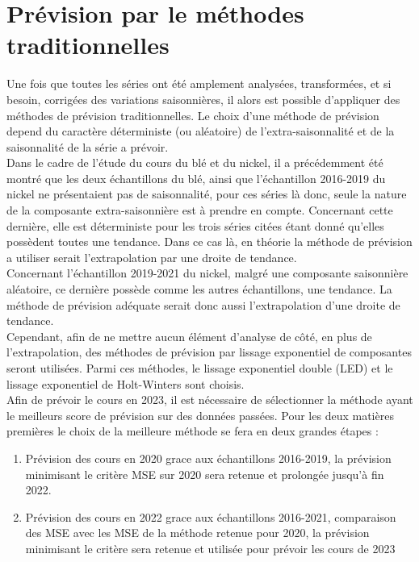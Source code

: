 \section{Prévision par le méthodes traditionnelles}
Une fois que toutes les séries ont été amplement analysées, transformées, et si besoin, corrigées des variations saisonnières, il alors est possible d'appliquer des 
méthodes de prévision traditionnelles. Le choix d'une méthode de prévision depend du caractère déterministe (ou aléatoire) de l'extra-saisonnalité et de la saisonnalité de
la série a prévoir. \\[11pt]
Dans le cadre de l'étude du cours du blé et du nickel, il a précédemment été montré que les deux échantillons du blé, ainsi que l'échantillon 2016-2019 
du nickel ne présentaient pas de saisonnalité, pour ces séries là donc, seule la nature de la composante extra-saisonnière est à prendre en compte. Concernant cette 
dernière, elle est déterministe pour les trois séries citées étant donné qu'elles possèdent toutes une tendance. Dans ce cas là, en théorie la méthode de prévision a 
utiliser serait l'extrapolation par une droite de tendance.\\[11pt]
Concernant l'échantillon 2019-2021 du nickel, malgré une composante saisonnière aléatoire, ce dernière possède comme les autres échantillons, une tendance. La méthode de 
prévision adéquate serait donc aussi l'extrapolation d'une droite de tendance.\\[11pt]
Cependant, afin de ne mettre aucun élément d'analyse de côté, en plus de l'extrapolation, des méthodes de prévision par lissage exponentiel de composantes seront 
utilisées. Parmi ces méthodes, le lissage exponentiel double (LED) et le lissage exponentiel de Holt-Winters sont choisis. \\[11pt]
Afin de prévoir le cours en 2023, il est nécessaire de sélectionner la méthode ayant le meilleurs score de prévision sur des données passées. Pour les deux matières 
premières le choix de la meilleure méthode se fera en deux grandes étapes :
\begin{enumerate}
    \item Prévision des cours en 2020 grace aux échantillons 2016-2019, la prévision minimisant le critère MSE sur 2020 sera retenue et prolongée jusqu'à fin 2022.
    \item Prévision des cours en 2022 grace aux échantillons 2016-2021, comparaison des MSE avec les MSE de la méthode retenue pour 2020, la prévision minimisant le 
            critère sera retenue et utilisée pour prévoir les cours de 2023 
\end{enumerate}

